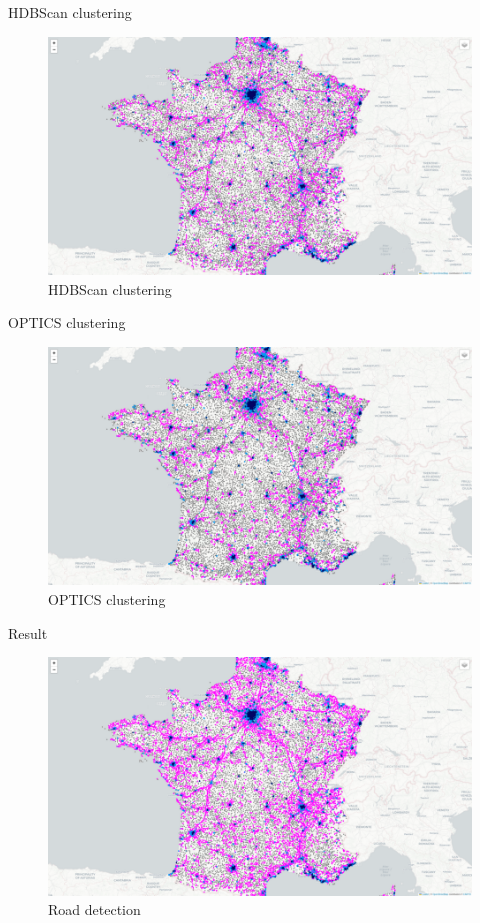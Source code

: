\begin{frame}{HDBScan clustering}
    \begin{figure}
        \includegraphics[height=0.6\paperheight]{images/cartes/road_detection/hdb.png}
        \caption{HDBScan clustering}
    \end{figure}
\end{frame}

\begin{frame}{OPTICS clustering}
    \begin{figure}
        \includegraphics[height=0.6\paperheight]{images/cartes/road_detection/opt.png}
        \caption{OPTICS clustering}
    \end{figure}
\end{frame}

\begin{frame}{Result}
    \begin{figure}
        \includegraphics[height=0.6\paperheight]{images/cartes/road_detection/res.png}
        \caption{Road detection}
    \end{figure}
\end{frame}

